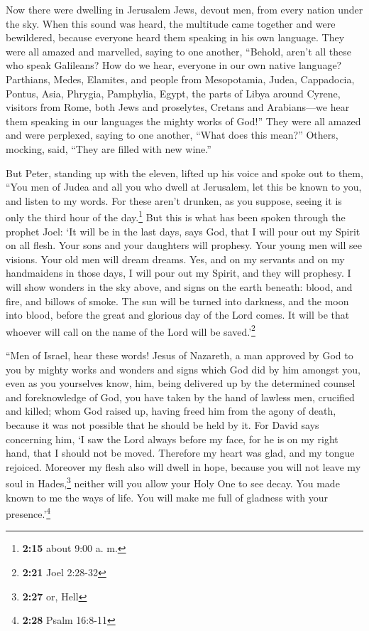  Now there were dwelling in Jerusalem Jews, devout men,
from every nation under the sky.  When this sound was
heard, the multitude came together and were bewildered, because everyone
heard them speaking in his own language.  They were all
amazed and marvelled, saying to one another, ``Behold, aren't all these
who speak Galileans?  How do we hear, everyone in our own
native language?  Parthians, Medes, Elamites, and people
from Mesopotamia, Judea, Cappadocia, Pontus, Asia, 
Phrygia, Pamphylia, Egypt, the parts of Libya around Cyrene, visitors
from Rome, both Jews and proselytes,  Cretans and
Arabians---we hear them speaking in our languages the mighty works of
God!''  They were all amazed and were perplexed, saying
to one another, ``What does this mean?''  Others,
mocking, said, ``They are filled with new wine.''

 But Peter, standing up with the eleven, lifted up his
voice and spoke out to them, ``You men of Judea and all you who dwell at
Jerusalem, let this be known to you, and listen to my words.
 For these aren't drunken, as you suppose, seeing it is
only the third hour of the day.\footnote{\textbf{2:15} about 9:00 a. m.}
 But this is what has been spoken through the prophet
Joel:  `It will be in the last days, says God, that I
will pour out my Spirit on all flesh. Your sons and your daughters will
prophesy. Your young men will see visions. Your old men will dream
dreams.  Yes, and on my servants and on my handmaidens in
those days, I will pour out my Spirit, and they will prophesy.
 I will show wonders in the sky above, and signs on the
earth beneath: blood, and fire, and billows of smoke. 
The sun will be turned into darkness, and the moon into blood, before
the great and glorious day of the Lord comes.  It will be
that whoever will call on the name of the Lord will be
saved.'\footnote{\textbf{2:21} Joel 2:28-32}

 ``Men of Israel, hear these words! Jesus of Nazareth, a
man approved by God to you by mighty works and wonders and signs which
God did by him amongst you, even as you yourselves know, 
him, being delivered up by the determined counsel and foreknowledge of
God, you have taken by the hand of lawless men, crucified and killed;
 whom God raised up, having freed him from the agony of
death, because it was not possible that he should be held by it.
 For David says concerning him, `I saw the Lord always
before my face, for he is on my right hand, that I should not be moved.
 Therefore my heart was glad, and my tongue rejoiced.
Moreover my flesh also will dwell in hope,  because you
will not leave my soul in Hades,\footnote{\textbf{2:27} or, Hell}
neither will you allow your Holy One to see decay.  You
made known to me the ways of life. You will make me full of gladness
with your presence.'\footnote{\textbf{2:28} Psalm 16:8-11}

